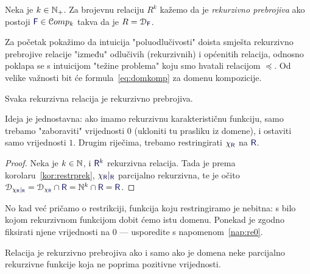 \begin{definicija}[{name=[rekurzivna prebrojivost]}]
Neka je $k\in{\mathbb N}_+$. Za brojevnu relaciju $R^k$ kažemo da je \emph{rekurzivno prebrojiva} ako postoji $\f F\in\mathcal Comp_k$ takva da je $R=\dom{\f F}$.
\end{definicija}



Za početak pokažimo da intuicija "poluodlučivosti" doista smješta rekurzivno prebrojive relacije "između" odlučivih (rekurzivnih) i općenitih relacija, odnosno poklapa se s intuicijom "težine problema" koju smo hvatali relacijom $\preceq$. Od velike važnosti bit će formula~\eqref{eq:domkomp} za domenu kompozicije.

\begin{propozicija}[{name=[rekurzivna prebrojivost rekurzivnih relacija]}]\label{pp:rekire}
Svaka rekurzivna relacija je rekurzivno prebrojiva.
\end{propozicija}
Ideja je jednostavna: ako imamo rekurzivnu karakterističnu funkciju, samo trebamo "zaboraviti" vrijednosti $0$ (ukloniti tu prasliku iz domene), i ostaviti samo vrijednosti $1$. Drugim riječima, trebamo restringirati $\chi_{\f R}$ na $\f R$.
\begin{proof}
Neka je $k\in{\mathbb N}$, i $\f R^k$ rekurzivna relacija. Tada je prema korolaru~\ref{kor:restrprek}, $\chi_{\f R}|_{\f R}$ parcijalno rekurzivna, te je očito $\dom{\chi_{\f R}|_{\f R}}=\dom{\chi_{\f R}}\cap\f R=\N^k\cap\f R=\f R$.
\end{proof}

No kad već pričamo o restrikciji, funkcija koju restringiramo je nebitna: s bilo kojom rekurzivnom funkcijom dobit ćemo istu domenu. Ponekad je zgodno fiksirati njene vrijednosti na $0$ --- usporedite s napomenom~\ref{nap:re0}.

\begin{korolar}[{name=[za rekurzivno prebrojive domene vrijednosti funkcije nisu bitne]}]\label{kor:redom0im}
Relacija je rekurzivno prebrojiva ako i samo ako je domena neke parcijalno rekurzivne funkcije koja ne poprima pozitivne vrijednosti.
\end{korolar}

